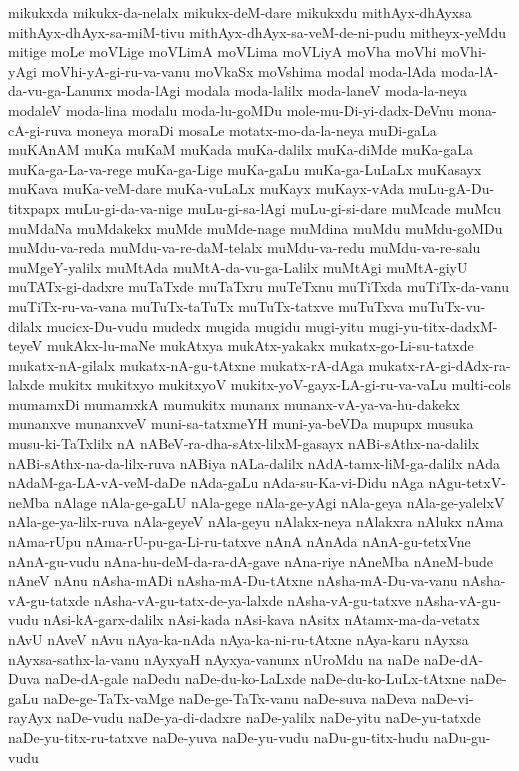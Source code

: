 {mikukxda
mikukx-da-nelalx
mikukx-deM-dare
mikukxdu
mithAyx-dhAyxsa
mithAyx-dhAyx-sa-miM-tivu
mithAyx-dhAyx-sa-veM-de-ni-pudu
mitheyx-yeMdu
mitige
moLe
moVLige
moVLimA
moVLima
moVLiyA
moVha
moVhi
moVhi-yAgi
moVhi-yA-gi-ru-va-vanu
moVkaSx
moVshima
modal
moda-lAda
moda-lA-da-vu-ga-Lanunx
moda-lAgi
modala
moda-lalilx
moda-laneV
moda-la-neya
modaleV
moda-lina
modalu
moda-lu-goMDu
mole-mu-Di-yi-dadx-DeVnu
mona-cA-gi-ruva
moneya
moraDi
mosaLe
motatx-mo-da-la-neya
muDi-gaLa
muKAnAM
muKa
muKaM
muKada
muKa-dalilx
muKa-diMde
muKa-gaLa
muKa-ga-La-va-rege
muKa-ga-Lige
muKa-gaLu
muKa-ga-LuLaLx
muKasayx
muKava
muKa-veM-dare
muKa-vuLaLx
muKayx
muKayx-vAda
muLu-gA-Du-titxpapx
muLu-gi-da-va-nige
muLu-gi-sa-lAgi
muLu-gi-si-dare
muMcade
muMcu
muMdaNa
muMdakekx
muMde
muMde-nage
muMdina
muMdu
muMdu-goMDu
muMdu-va-reda
muMdu-va-re-daM-telalx
muMdu-va-redu
muMdu-va-re-salu
muMgeY-yalilx
muMtAda
muMtA-da-vu-ga-Lalilx
muMtAgi
muMtA-giyU
muTATx-gi-dadxre
muTaTxde
muTaTxru
muTeTxnu
muTiTxda
muTiTx-da-vanu
muTiTx-ru-va-vana
muTuTx-taTuTx
muTuTx-tatxve
muTuTxva
muTuTx-vu-dilalx
mucicx-Du-vudu
mudedx
mugida
mugidu
mugi-yitu
mugi-yu-titx-dadxM-teyeV
mukAkx-lu-maNe
mukAtxya
mukAtx-yakakx
mukatx-go-Li-su-tatxde
mukatx-nA-gilalx
mukatx-nA-gu-tAtxne
mukatx-rA-dAga
mukatx-rA-gi-dAdx-ra-lalxde
mukitx
mukitxyo
mukitxyoV
mukitx-yoV-gayx-LA-gi-ru-va-vaLu
multi-cols
mumamxDi
mumamxkA
mumukitx
munanx
munanx-vA-ya-va-hu-dakekx
munanxve
munanxveV
muni-sa-tatxmeYH
muni-ya-beVDa
mupupx
musuka
musu-ki-TaTxlilx
nA
nABeV-ra-dha-sAtx-lilxM-gasayx
nABi-sAthx-na-dalilx
nABi-sAthx-na-da-lilx-ruva
nABiya
nALa-dalilx
nAdA-tamx-liM-ga-dalilx
nAda
nAdaM-ga-LA-vA-veM-daDe
nAda-gaLu
nAda-su-Ka-vi-Didu
nAga
nAgu-tetxV-neMba
nAlage
nAla-ge-gaLU
nAla-gege
nAla-ge-yAgi
nAla-geya
nAla-ge-yalelxV
nAla-ge-ya-lilx-ruva
nAla-geyeV
nAla-geyu
nAlakx-neya
nAlakxra
nAlukx
nAma
nAma-rUpu
nAma-rU-pu-ga-Li-ru-tatxve
nAnA
nAnAda
nAnA-gu-tetxVne
nAnA-gu-vudu
nAna-hu-deM-da-ra-dA-gave
nAna-riye
nAneMba
nAneM-bude
nAneV
nAnu
nAsha-mADi
nAsha-mA-Du-tAtxne
nAsha-mA-Du-va-vanu
nAsha-vA-gu-tatxde
nAsha-vA-gu-tatx-de-ya-lalxde
nAsha-vA-gu-tatxve
nAsha-vA-gu-vudu
nAsi-kA-garx-dalilx
nAsi-kada
nAsi-kava
nAsitx
nAtamx-ma-da-vetatx
nAvU
nAveV
nAvu
nAya-ka-nAda
nAya-ka-ni-ru-tAtxne
nAya-karu
nAyxsa
nAyxsa-sathx-la-vanu
nAyxyaH
nAyxya-vanunx
nUroMdu
na
naDe
naDe-dA-Duva
naDe-dA-gale
naDedu
naDe-du-ko-LaLxde
naDe-du-ko-LuLx-tAtxne
naDe-gaLu
naDe-ge-TaTx-vaMge
naDe-ge-TaTx-vanu
naDe-suva
naDeva
naDe-vi-rayAyx
naDe-vudu
naDe-ya-di-dadxre
naDe-yalilx
naDe-yitu
naDe-yu-tatxde
naDe-yu-titx-ru-tatxve
naDe-yuva
naDe-yu-vudu
naDu-gu-titx-hudu
naDu-gu-vudu
}
